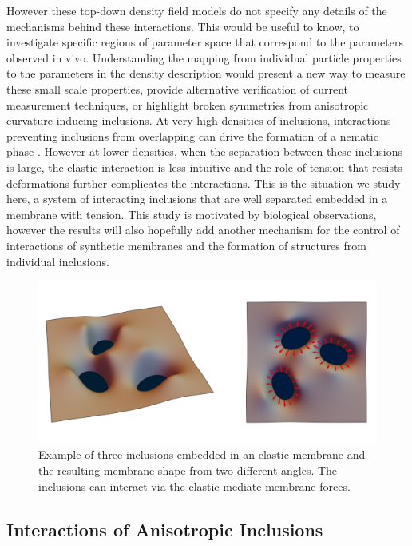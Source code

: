 However these top-down density field models do not specify any details of the mechanisms behind these interactions. This would be useful to know, to investigate specific regions of parameter space that correspond to the parameters observed in vivo. Understanding the mapping from individual particle properties to the parameters in the density description would present a new way to measure these small scale properties, provide alternative verification of current measurement techniques, or highlight broken symmetries from anisotropic curvature inducing inclusions. At very high densities of inclusions, interactions preventing inclusions from overlapping can drive the formation of a nematic phase \cite{tozzi_theory_2021}. However at lower densities, when the separation between these inclusions is large, the elastic interaction is less intuitive and the role of tension that resists deformations further complicates the interactions. This is the situation we study here, a system of interacting inclusions that are well separated embedded in a membrane with tension. This study is motivated by biological observations, however the results will also hopefully add another mechanism for the control of interactions of synthetic membranes and the formation of structures from individual inclusions.

\begin{figure}[h]
\centering
\includegraphics[width=12cm]{elastic_figs/threeinc_scheme.pdf}
\caption{Example of three inclusions embedded in an elastic membrane and the resulting membrane shape from two different angles. The inclusions can interact via the elastic mediate membrane forces.}
\label{fig:overview}
\end{figure}

\subsection{Interactions of Anisotropic Inclusions}

